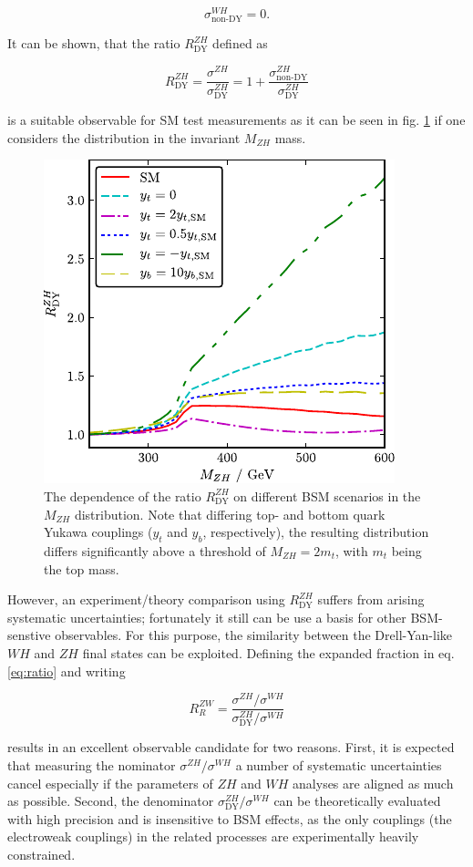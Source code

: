 \begin{equation*}
	\sigma^{WH}_\text{non-DY} = 0.
\end{equation*}

It can be shown, that the ratio $R^{ZH}_\text{DY}$ defined as

\begin{equation}
	R^{ZH}_\text{DY} = \frac{\sigma^{ZH}}{\sigma^{ZH}_\text{DY}} = 1 + \frac{\sigma^{ZH}_\text{non-DY}}{\sigma^{ZH}_\text{DY}}
	\label{eq:ratio}
\end{equation}

is a suitable observable for SM test measurements as it can be seen in fig. \ref{fig:RZH} if one considers the distribution in the invariant $M_{ZH}$ mass.

\begin{figure}[h!]
	\centering
	\includegraphics[width=0.6\linewidth]{figures/theory/RZH.pdf}
	\caption{The dependence of the ratio $R^{ZH}_\text{DY}$ on different BSM scenarios in the $M_{ZH}$ distribution. Note that differing top- and bottom quark Yukawa couplings ($y_t$ and $y_b$, respectively), the resulting distribution differs significantly above a threshold of $M_{ZH}=2m_t$, with $m_t$ being the top mass.}
	\label{fig:RZH}
\end{figure}

However, an experiment/theory comparison using $R^{ZH}_\text{DY}$ suffers from arising systematic uncertainties; fortunately it still can be use a basis for other BSM-senstive observables. For this purpose, the similarity between the Drell-Yan-like $WH$ and $ZH$ final states can be exploited. Defining the expanded fraction in eq. \ref{eq:ratio} and writing

\begin{equation}
	R^{ZW}_R = \frac{\sigma^{ZH}/\sigma^{WH}}{\sigma^{ZH}_\text{DY}/\sigma^{WH}}
\end{equation}

results in an excellent observable candidate for two reasons. First, it is expected that measuring the nominator $\sigma^{ZH}/\sigma^{WH}$ a number of systematic uncertainties cancel especially if the parameters of $ZH$ and $WH$ analyses are aligned as much as possible. Second, the denominator $\sigma^{ZH}_\text{DY}/\sigma^{WH}$ can be theoretically evaluated with high precision and is insensitive to BSM effects, as the only couplings (the electroweak couplings) in the related processes are experimentally heavily constrained.
